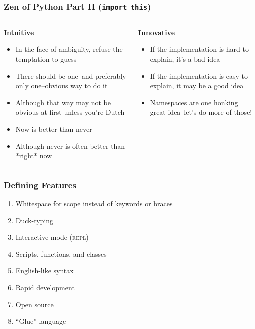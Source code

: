 \documentclass{beamer}
\begin{document}
\begin{frame}
  \frametitle{Zen of Python Part II (\texttt{import this})}
  \begin{columns}
  \begin{column}{0.60\textwidth}
    \textbf{Intuitive}
    \begin{itemize}
      \item In the face of ambiguity, refuse the temptation to guess
      \item There should be one--and preferably only one--obvious way to do it
      \item Although that way may not be obvious at first unless you're Dutch
      \item Now is better than never
      \item Although never is often better than *right* now
    \end{itemize}
  \end{column}
  \begin{column}{0.40\textwidth}
    \textbf{Innovative}
    \begin{itemize}
      \item If the implementation is hard to explain, it's a bad idea
      \item If the implementation is easy to explain, it may be a good idea
      \item Namespaces are one honking great idea--let's do more of those!
    \end{itemize}
  \end{column}
 \end{columns}
\end{frame}

\begin{frame}
  \frametitle{Defining Features}
  \begin{enumerate}
    \item Whitespace for scope instead of keywords or braces
    \item Duck-typing
    \item Interactive mode (\textsc{repl})
    \item Scripts, functions, and classes
    \item English-like syntax
    \item Rapid development
    \item Open source
    \item ``Glue'' language
  \end{enumerate}
\end{frame}
\end{document}

